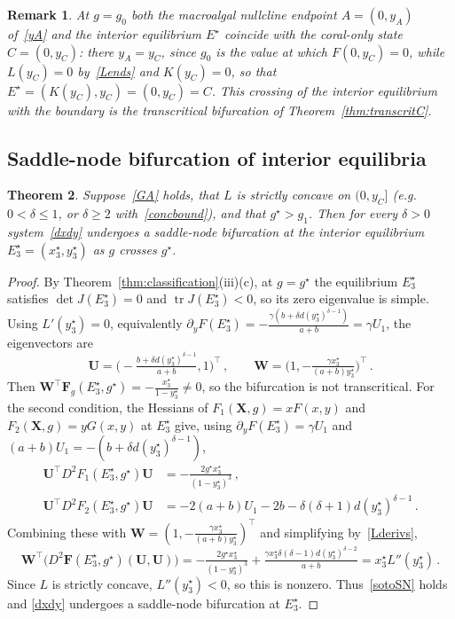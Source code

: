 \documentclass[reqno,11pt]{amsart}
\newtheorem{thm}{Theorem}[section]
\newtheorem{rem}[thm]{Remark}
\numberwithin{equation}{section}
\begin{document}
\begin{rem}
At $g=g_0$ both the macroalgal nullcline endpoint $A=(0,y_A)$ of~\eqref{yA} and the interior equilibrium $E^\star$ coincide with the coral-only state $C=(0,y_C)$: there $y_A=y_C$, since $g_0$ is the value at which $F(0,y_C)=0$, while $L(y_C)=0$ by~\eqref{Lends} and $K(y_C)=0$, so that $E^\star=(K(y_C),y_C)=(0,y_C)=C$. This crossing of the interior equilibrium with the boundary is the transcritical bifurcation of Theorem~\ref{thm:transcritC}.
\end{rem}

\smallskip 

\subsection{Saddle-node bifurcation of interior equilibria}\label{subsec:bif-interior}

\begin{thm}\label{thm:saddlenode}
Suppose~\eqref{GA} holds, that $L$ is strictly concave on $(0,y_C]$ (e.g.\ $0<\delta\le1$, or $\delta\ge2$ with~\eqref{concbound}), and that $g^\star>g_1$. Then for every $\delta>0$ system~\eqref{dxdy} undergoes a saddle-node bifurcation at the interior equilibrium $E_3^\star=(x_3^\star,y_3^\star)$ as $g$ crosses $g^\star$.
\end{thm}

\begin{proof}
By Theorem~\ref{thm:classification}(iii)(c), at $g=g^\star$ the equilibrium $E_3^\star$ satisfies $\det J(E_3^\star)=0$ and $\operatorname{tr}J(E_3^\star)<0$, so its zero eigenvalue is simple. Using $L'(y_3^\star)=0$, equivalently $\partial_yF(E_3^\star)=-\tfrac{\gamma(b+\delta d(y_3^\star)^{\delta-1})}{a+b}=\gamma U_1$, the eigenvectors are
\[
\mathbf U=\Big(-\tfrac{b+\delta d(y_3^\star)^{\delta-1}}{a+b},1\Big)^\top\,,\qquad \mathbf W=\Big(1,-\tfrac{\gamma x_3^\star}{(a+b)y_3^\star}\Big)^\top\,.
\]
Then $\mathbf W^\top\mathbf F_g(E_3^\star,g^\star)=-\tfrac{x_3^\star}{1-y_3^\star}\neq0$, so the bifurcation is not transcritical. For the second condition, the Hessians of $F_1(\mathbf X,g)=xF(x,y)$ and $F_2(\mathbf X,g)=yG(x,y)$ at $E_3^\star$ give, using $\partial_yF(E_3^\star)=\gamma U_1$ and $(a+b)U_1=-(b+\delta d(y_3^\star)^{\delta-1})$,
\[
\begin{aligned}
\mathbf U^\top D^2F_1(E_3^\star,g^\star)\mathbf U&=-\tfrac{2g^\star x_3^\star}{(1-y_3^\star)^3}\,,\\[2pt]
\mathbf U^\top D^2F_2(E_3^\star,g^\star)\mathbf U&=-2(a+b)U_1-2b-\delta(\delta+1)d(y_3^\star)^{\delta-1}\,.
\end{aligned}
\]
Combining these with $\mathbf W=(1,-\tfrac{\gamma x_3^\star}{(a+b)y_3^\star})^\top$ and simplifying by~\eqref{Lderivs},
\[
\mathbf W^\top\big(D^2\mathbf F(E_3^\star,g^\star)(\mathbf U,\mathbf U)\big)
=-\tfrac{2g^\star x_3^\star}{(1-y_3^\star)^3}+\tfrac{\gamma x_3^\star\delta(\delta-1)d(y_3^\star)^{\delta-2}}{a+b}
=x_3^\star L''(y_3^\star)\,.
\]
Since $L$ is strictly concave, $L''(y_3^\star)<0$, so this is nonzero. Thus~\eqref{sotoSN} holds and \eqref{dxdy} undergoes a saddle-node bifurcation at $E_3^\star$.
\end{proof}
\end{document}

